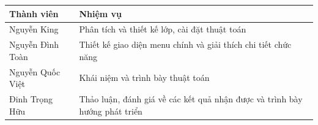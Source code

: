 \documentclass[a4paper]{article}
\begin{document}
\begin{table}[H]
    \centering
    \begin{tabular}{|l|l|}
    \hline
        \textbf{Thành viên} & \textbf{Nhiệm vụ} \\ \hline
        Nguyễn King & Phân tích và thiết kế lớp, cài đặt thuật toán \\ \hline
        Nguyễn Đình Toàn & Thiết kế giao diện menu chính và giải thích chi tiết chức năng \\ \hline
        Nguyễn Quốc Việt & Khái niệm và trình bày thuật toán \\ \hline
        Đinh Trọng Hữu & Thảo luận, đánh giá về các kết quả nhận được và trình bày hướng phát triển \\ \hline
    \end{tabular}
\end{table}
\vfill

\cite{sedgewick2001algorithms,chen2014path,deng2012fuzzy,javaid2013understanding,schulz2000dijkstra,makariye2017towards,bozyiugit2017public,lanning2014dijkstra,price2020c}
\pagebreak


\end{document}
